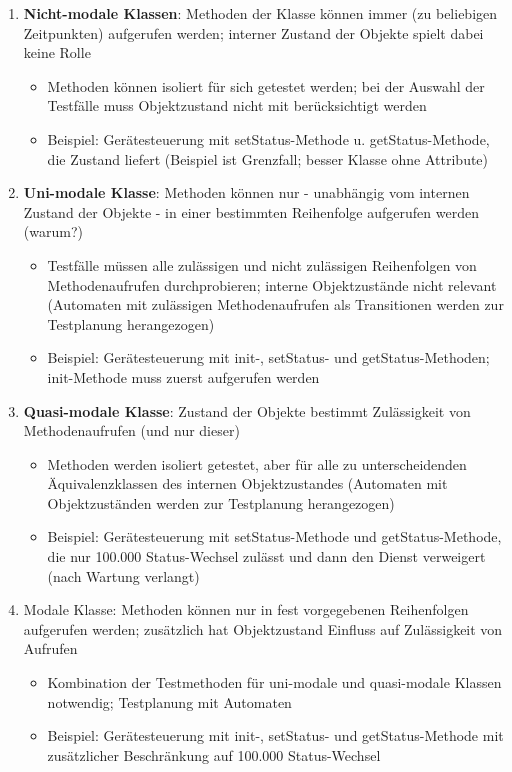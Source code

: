 \begin{enumerate}
	\item \textbf{Nicht-modale Klassen}: Methoden der Klasse können immer (zu beliebigen Zeitpunkten) aufgerufen werden; interner Zustand der Objekte spielt dabei keine Rolle
	\begin{itemize}
		\item Methoden können isoliert für sich getestet werden; bei der Auswahl der Testfälle muss Objektzustand nicht mit berücksichtigt werden
		\item Beispiel: Gerätesteuerung mit setStatus-Methode u. getStatus-Methode, die Zustand liefert (Beispiel ist Grenzfall; besser Klasse ohne Attribute)
	\end{itemize}
	\item \textbf{Uni-modale Klasse}: Methoden können nur - unabhängig vom internen Zustand der Objekte - in einer bestimmten Reihenfolge aufgerufen werden (warum?)
	\begin{itemize}
		\item Testfälle müssen alle zulässigen und nicht zulässigen Reihenfolgen von Methodenaufrufen durchprobieren; interne Objektzustände nicht relevant (Automaten mit zulässigen Methodenaufrufen als Transitionen werden zur Testplanung herangezogen)
		\item Beispiel: Gerätesteuerung mit init-, setStatus- und getStatus-Methoden; init-Methode muss zuerst aufgerufen werden
	\end{itemize}
	\item \textbf{Quasi-modale Klasse}: Zustand der Objekte bestimmt Zulässigkeit von Methodenaufrufen (und nur dieser)
	\begin{itemize}
		\item Methoden werden isoliert getestet, aber für alle zu unterscheidenden Äquivalenzklassen des internen Objektzustandes (Automaten mit Objektzuständen werden zur Testplanung herangezogen)
		\item Beispiel: Gerätesteuerung mit setStatus-Methode und getStatus-Methode, die nur 100.000 Status-Wechsel zulässt und dann den Dienst verweigert (nach Wartung verlangt)
	\end{itemize}
	\item Modale Klasse: Methoden können nur in fest vorgegebenen Reihenfolgen aufgerufen werden; zusätzlich hat Objektzustand Einfluss auf Zulässigkeit von Aufrufen
	\begin{itemize}
		\item Kombination der Testmethoden für uni-modale und quasi-modale Klassen notwendig; Testplanung mit Automaten
		\item Beispiel: Gerätesteuerung mit init-, setStatus- und getStatus-Methode mit zusätzlicher Beschränkung auf 100.000 Status-Wechsel
	\end{itemize}
\end{enumerate}


